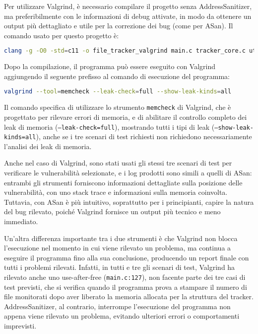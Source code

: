 Per utilizzare Valgrind, è necessario compilare il progetto senza AddressSanitizer,
ma preferibilmente con le informazioni di debug attivate, in modo da ottenere un
output più dettagliato e utile per la correzione dei bug (come per ASan). Il
comando usato per questo progetto è: \begin{lstlisting}[language=bash, numbers=none]
clang -g -O0 -std=c11 -o file_tracker_valgrind main.c tracker_core.c utils.c
\end{lstlisting}

Dopo la compilazione, il programma può essere eseguito con Valgrind aggiungendo il
seguente prefisso al comando di esecuzione del programma:
\begin{lstlisting}[language=bash, numbers=none]
valgrind --tool=memcheck --leak-check=full --show-leak-kinds=all
\end{lstlisting}

Il comando specifica di utilizzare lo strumento \texttt{memcheck} di Valgrind, che
è progettato per rilevare errori di memoria, e di abilitare il controllo
completo dei leak di memoria (\texttt{--leak-check=full}), mostrando tutti i
tipi di leak (\texttt{--show-leak-kinds=all}), anche se i tre scenari di test
richiesti non richiedono necessariamente l'analisi dei leak di memoria.

Anche nel caso di Valgrind, sono stati usati gli stessi tre scenari di test per verificare
le vulnerabilità selezionate, e i log prodotti sono simili a quelli di ASan: entrambi
gli strumenti forniscono informazioni dettagliate sulla posizione delle vulnerabilità,
con uno stack trace e informazioni sulla memoria coinvolta. Tuttavia, con ASan è
più intuitivo, soprattutto per i principianti, capire la natura del bug rilevato,
poiché Valgrind fornisce un output più tecnico e meno immediato.

Un'altra differenza importante tra i due strumenti è che Valgrind non blocca l'esecuzione
nel momento in cui viene rilevato un problema, ma continua a eseguire il
programma fino alla sua conclusione, producendo un report finale con tutti i problemi
rilevati. Infatti, in tutti e tre gli scenari di test, Valgrind ha rilevato
anche uno use-after-free (\texttt{main.c:127}), non facente parte dei tre casi
di test previsti, che si verifica quando il programma prova a stampare il numero
di file monitorati dopo aver liberato la memoria allocata per la struttura del tracker.
AddressSanitizer, al contrario, interrompe l'esecuzione del programma non appena
viene rilevato un problema, evitando ulteriori errori o comportamenti imprevisti.

